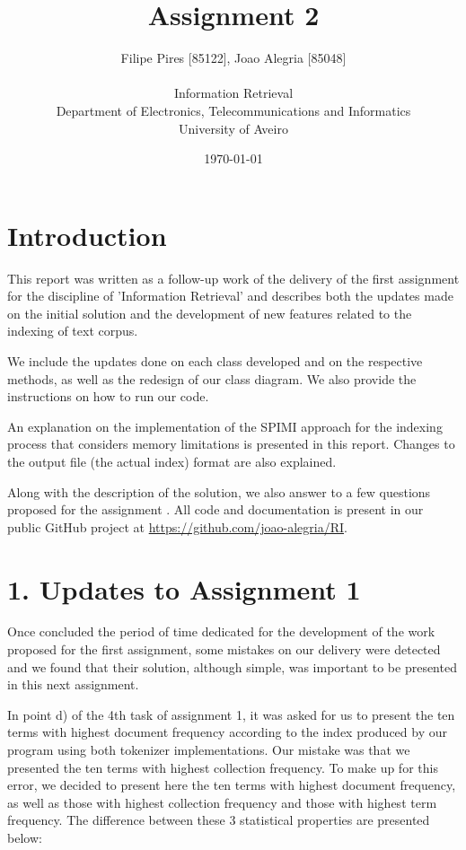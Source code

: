 \documentclass[12pt]{article}
\title{Assignment 2}
\author
{Filipe Pires [85122], Joao Alegria [85048]\\
\\
Information Retrieval\\
\normalsize{Department of Electronics, Telecommunications and Informatics}\\
\normalsize{University of Aveiro}\\
}
\date{\today{}}
\begin{document}
 
\baselineskip18pt
\maketitle 

\section*{Introduction}

This report was written as a follow-up work of the delivery of the first 
assignment for the discipline of 'Information Retrieval' and describes both
the updates made on the initial solution and the development of new features 
related to the indexing of text corpus.

We include the updates done on each class developed and on the respective
methods, as well as the redesign of our class diagram.
We also provide the instructions on how to run our code.

An explanation on the implementation of the SPIMI approach for the indexing
process that considers memory limitations is presented in this report.
Changes to the output file (the actual index) format are also explained.

Along with the description of the solution, we also answer to a few questions
proposed for the assignment \cite{assign2}.
All code and documentation is present in our public GitHub project at 
\url{https://github.com/joao-alegria/RI}. 

\newpage
\section*{1. Updates to Assignment 1}

Once concluded the period of time dedicated for the development of the work 
proposed for the first assignment, some mistakes on our delivery were
detected and we found that their solution, although simple, was important to
be presented in this next assignment.

In point d) of the 4th task of assignment 1, it was asked for us to present
the ten terms with highest document frequency according to the index produced
by our program using both tokenizer implementations.
Our mistake was that we presented the ten terms with highest collection 
frequency. To make up for this error, we decided to present here the ten terms
with highest document frequency, as well as those with highest collection 
frequency and those with highest term frequency.
The difference between these 3 statistical properties are presented below:
\end{document}
